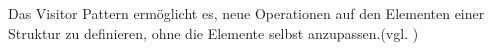 \glqq Das Visitor Pattern ermöglicht es, neue Operationen auf den Elementen einer Struktur zu definieren, ohne die Elemente selbst anzupassen.\grqq (vgl. \cite{EIST06})
